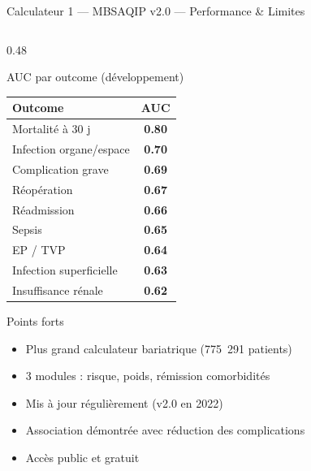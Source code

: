 \documentclass[aspectratio=169]{beamer}
\newcommand{\tightlist}{%
  \setlength{\itemsep}{1pt}\setlength{\parskip}{0pt}%
  \setlength{\parsep}{0pt}\setlength{\topsep}{2pt}}
\begin{document}
\begin{frame}[shrink=5]{Calculateur 1 --- MBSAQIP v2.0 --- Performance \& Limites}
  \begin{columns}[T]
    \begin{column}{0.48\textwidth}
      \begin{block}{AUC par outcome (développement)}
        \footnotesize
        \begin{tabular}{lc}
          \toprule
          \textbf{Outcome} & \textbf{AUC} \\
          \midrule
          Mortalité à 30 j & \textcolor{vertdoux}{\textbf{0.80}} \\
          Infection organe/espace & \textcolor{vertdoux}{\textbf{0.70}} \\
          Complication grave & \textcolor{orangemod}{\textbf{0.69}} \\
          Réopération & \textcolor{orangemod}{\textbf{0.67}} \\
          Réadmission & \textcolor{orangemod}{\textbf{0.66}} \\
          Sepsis & \textcolor{orangemod}{\textbf{0.65}} \\
          EP / TVP & \textcolor{orangemod}{\textbf{0.64}} \\
          Infection superficielle & \textcolor{orangemod}{\textbf{0.63}} \\
          Insuffisance rénale & \textcolor{orangemod}{\textbf{0.62}} \\
          \bottomrule
        \end{tabular}
      \end{block}
      \vspace{0.2em}
      \begin{exampleblock}{Points forts}
        \footnotesize\tightlist
        \begin{itemize}\tightlist
          \item Plus grand calculateur bariatrique (775~291 patients)
          \item 3 modules : risque, poids, rémission comorbidités
          \item Mis à jour régulièrement (v2.0 en 2022)
          \item Association démontrée avec réduction des complications
          \item Accès public et gratuit
        \end{itemize}
      \end{exampleblock}

\end{column}
\end{columns}
\end{frame}
\end{document}
